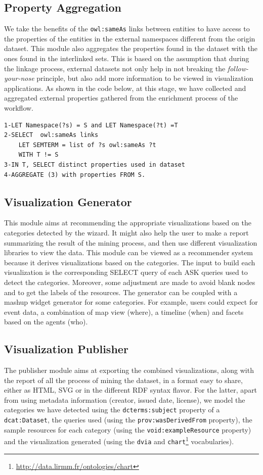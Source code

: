 \subsection{Property Aggregation}
We take the benefits of the \texttt{owl:sameAs} links between entities to have access to the properties of the entities in the external namespaces different from the origin dataset. This module also aggregates the properties found in the dataset with the ones found in the interlinked sets. This is based on the assumption that during the linkage process, external datasets not only help in not breaking the \textit{follow-your-nose} principle, but also add more information to be viewed in visualization applications. As shown in the code below, at this stage, we have collected and aggregated external properties gathered from the enrichment process of the workflow.

\begin{verbatim}
1-LET Namespace(?s) = S and LET Namespace(?t) =T
2-SELECT  owl:sameAs links
	LET SEMTERM = list of ?s owl:sameAs ?t
	WITH T != S
3-IN T, SELECT distinct properties used in dataset
4-AGGREGATE (3) with properties FROM S.
\end{verbatim}

\subsection{Visualization Generator}
This module aims at recommending the appropriate visualizations based on the categories detected by the wizard. It might also help the user to make a report summarizing the result of the mining process, and then use different visualization libraries to view the data. This module can be viewed as a recommender system because it derives visualizations based on the categories. The input to build each visualization is the corresponding SELECT query of each ASK queries used to detect the categories. Moreover, some adjustment are made to avoid blank nodes and to get the labels of the resources. The generator can be coupled with a mashup widget generator for some  categories. For example, users could expect for event data, a combination of map view (where), a timeline (when) and facets based on the agents (who).

\subsection{Visualization Publisher}
The publisher module aims at exporting the combined visualizations, along with the report of all the process of mining the dataset, in a format easy to share, either as HTML, SVG or in the different RDF syntax flavor. For the latter, apart from using metadata information (creator, issued date, license), we model the categories we have detected using the \texttt{dcterms:subject} property of a \texttt{dcat:Dataset}, the queries used (using the \texttt{prov:wasDerivedFrom} property), the sample resources for each category (using the \texttt{void:exampleResource} property) and the visualization generated (using the \texttt{dvia} and \texttt{chart}\footnote{\url{http://data.lirmm.fr/ontologies/chart}} vocabularies).

